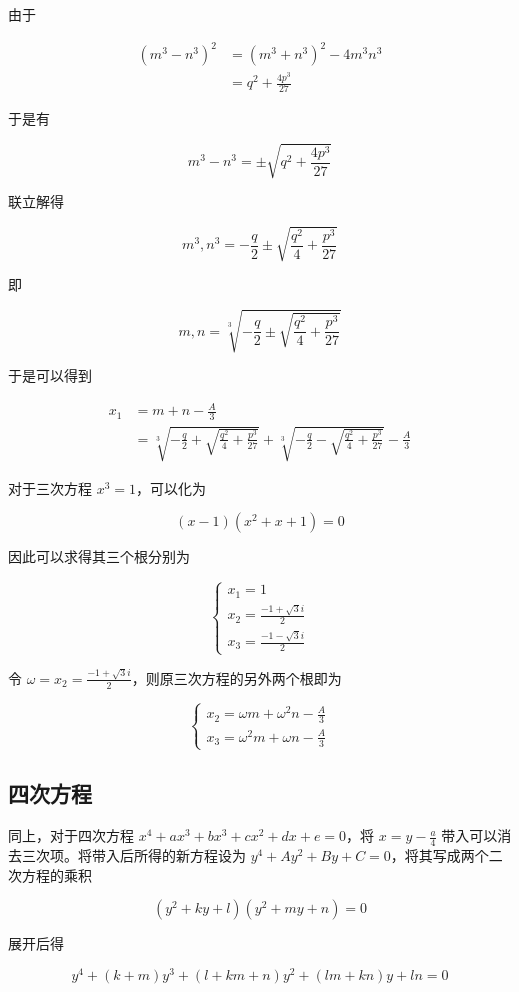 \documentclass[hyperref,UTF8,12pt,a4paper]{ctexart}
\begin{document}
由于

$$
\begin{aligned}
(m^3-n^3)^2&=(m^3+n^3)^2-4m^3n^3 \\
&=q^2+\frac{4p^3}{27}
\end{aligned}
$$

于是有

$$
m^3-n^3=\pm\sqrt{q^2+\frac{4p^3}{27}}
$$

联立解得

$$
m^3,n^3=-\frac q2\pm\sqrt{\frac{q^2}4+\frac{p^3}{27}}
$$

即

$$
m,n=\sqrt[3]{-\frac q2\pm\sqrt{\frac{q^2}4+\frac{p^3}{27}}}
$$

于是可以得到

$$
\begin{aligned}
x_1&=m+n-\frac A3 \\
&=\sqrt[3]{-\frac q2+\sqrt{\frac{q^2}4+\frac{p^3}{27}}}+\sqrt[3]{-\frac q2-\sqrt{\frac{q^2}4+\frac{p^3}{27}}}-\frac A3
\end{aligned}
$$

对于三次方程 $x^3=1$，可以化为

$$
(x-1)(x^2+x+1)=0
$$

因此可以求得其三个根分别为

$$
\begin{cases}
x_1=1\\
x_2=\frac{-1+\sqrt{3}i}2\\
x_3=\frac{-1-\sqrt{3}i}2
\end{cases}
$$

令 $\omega=x_2=\frac{-1+\sqrt{3}i}2$，则原三次方程的另外两个根即为

$$
\begin{cases}
x_2=\omega m+\omega^2n-\frac A3 \\
x_3=\omega^2m+\omega n-\frac A3
\end{cases}
$$

\subsection{四次方程}

同上，对于四次方程 $x^4+ax^3+bx^3+cx^2+dx+e=0$，将 $x=y-\frac a4$ 带入可以消去三次项。将带入后所得的新方程设为 $y^4+Ay^2+By+C=0$，将其写成两个二次方程的乘积

$$
(y^2+ky+l)(y^2+my+n)=0
$$

展开后得

$$
y^4+(k+m)y^3+(l+km+n)y^2+(lm+kn)y+ln=0
$$
\end{document}
